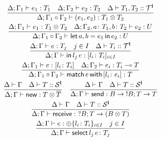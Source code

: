 \begin{figure}[t]
\begin{gather*}
{    }
   \\
    \frac{
      \Delta;\Gamma_1 \vdash e_1 : T_1
      \quad
      \Delta;\Gamma_2 \vdash e_2 : T_2
      \quad
      \Delta \vdash T_1,T_2 ::\kindt^\Linear
    }{
      \Delta;\Gamma_1\circ \Gamma_2 \vdash (e_1,e_2) : T_1 \otimes T_2
    }
    \\
    \frac{
      \Delta;\Gamma_1 \vdash e_1 : T_1 \otimes T_2
      \quad
      \Delta;\Gamma_2, a\colon T_1, b\colon T_2 \vdash e_2: U
    }{
      \Delta;\Gamma_1 \circ \Gamma_2 \vdash \letin{a,b}{e_1}{e_2} : U
    }
    \\
    \frac{
      \Delta;\Gamma \vdash e : T_j \quad j\in I \quad
      \Delta\vdash T_i::\kindt^\Linear
    }{
      \Delta;\Gamma \vdash \inject {l_j} e : [l_i\colon T_i]_{i\in I}
    }
    \\
    \frac{
      \Delta;\Gamma_1 \vdash e : [l_i\colon T_i]
      \quad
      \Delta;\Gamma_2 \vdash e_i : T_i \multimap T
    }{
      \Delta;\Gamma_1\circ \Gamma_2 \vdash \match e {l_i\colon e_i} : T
    }
    \\
    \frac{
      \Delta \vdash \Gamma
      \quad
      \Delta \vdash T::\kinds^\Linear
    }{
      \Delta;\Gamma \vdash \newk : T\otimes \dual T
    }
    \quad
    \frac{
      \Delta \vdash \Gamma
      \quad
      \Delta \vdash T::\kinds^\Linear
    }{
      \Delta;\Gamma\vdash \sendk : B \rightarrow \;!B;T \rightarrow T
    }
    \\
    \frac{
      \Delta \vdash \Gamma
      \quad
      \Delta \vdash T::\kinds^\Linear
    }{
      \Delta;\Gamma \vdash \recvk : \;?B;T \rightarrow (B \otimes T)
    }
    \\
    \frac{
      \Delta;\Gamma \vdash e : \oplus\{l_i\colon T_i\}_{i\in I}
      \quad
      j\in I
    }{
      \Delta;\Gamma \vdash \select {l_j} e \colon T_j
    }
    \\

\end{gather*}
\end{figure}
